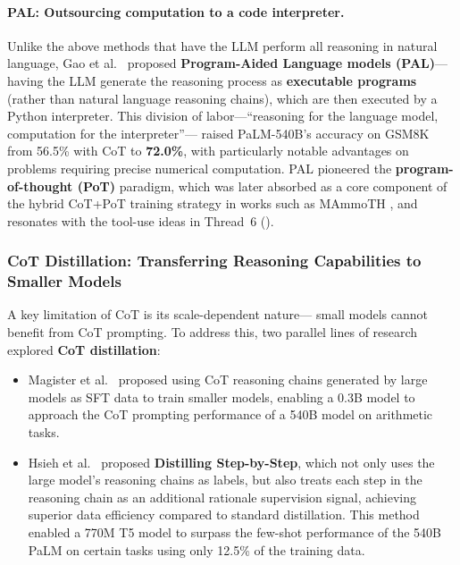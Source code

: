
\paragraph{PAL: Outsourcing computation to a code interpreter.}
Unlike the above methods that have the LLM perform all reasoning in natural language,
Gao et al.\ \cite{gao2022pal} proposed \textbf{Program-Aided Language models (PAL)}---
having the LLM generate the reasoning process as \textbf{executable programs} (rather than natural language reasoning chains),
which are then executed by a Python interpreter.
This division of labor---``reasoning for the language model, computation for the interpreter''---
raised PaLM-540B's accuracy on GSM8K from 56.5\% with CoT to \textbf{72.0\%},
with particularly notable advantages on problems requiring precise numerical computation.
PAL pioneered the \textbf{program-of-thought (PoT)} paradigm,
which was later absorbed as a core component of the hybrid CoT+PoT training strategy in works such as MAmmoTH \cite{yue2023mammoth},
and resonates with the tool-use ideas in Thread~6 ().

\subsubsection{CoT Distillation: Transferring Reasoning Capabilities to Smaller Models}

A key limitation of CoT is its scale-dependent nature---
small models cannot benefit from CoT prompting.
To address this, two parallel lines of research explored \textbf{CoT distillation}:

\begin{itemize}[leftmargin=2em]
  \item Magister et al.\ \cite{magister2023cotdistill} proposed using CoT reasoning chains generated by large models
    as SFT data to train smaller models,
    enabling a 0.3B model to approach the CoT prompting performance of a 540B model on arithmetic tasks.

  \item Hsieh et al.\ \cite{hsieh2023distillstep} proposed \textbf{Distilling Step-by-Step},
    which not only uses the large model's reasoning chains as labels,
    but also treats each step in the reasoning chain as an additional rationale supervision signal,
    achieving superior data efficiency compared to standard distillation.
    This method enabled a 770M T5 model to surpass the few-shot performance of the 540B PaLM on certain tasks using only 12.5\% of the training data.
\end{itemize}

